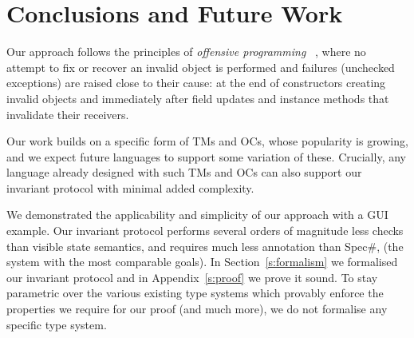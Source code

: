 
\section{Conclusions and Future Work}
\label{s:conclusion}
Our approach follows the principles of \emph{offensive programming}
~\cite{stephens2015beginning}, where 
no attempt to fix or recover an invalid object is performed and
 failures (unchecked exceptions)
		are raised close to their cause: at the end of constructors creating invalid objects and immediately after field updates and instance methods that invalidate their receivers.



Our work builds on a specific form of TMs and OCs, whose
popularity is growing, and we expect future languages to support some variation of these.
Crucially, any language already designed with such TMs and OCs
can also support our invariant protocol with minimal added complexity.


We demonstrated the applicability and simplicity of our approach with a GUI example.
Our invariant protocol performs several orders of magnitude less checks than visible state semantics, and requires much less annotation 
than Spec\#, (the system with the most comparable goals). In Section~\ref{s:formalism} we formalised our invariant protocol and in Appendix~\ref{s:proof} we prove it sound.
To stay parametric over the various existing type systems which provably enforce the properties we require for our proof (and much more), we do not formalise any specific type system.


